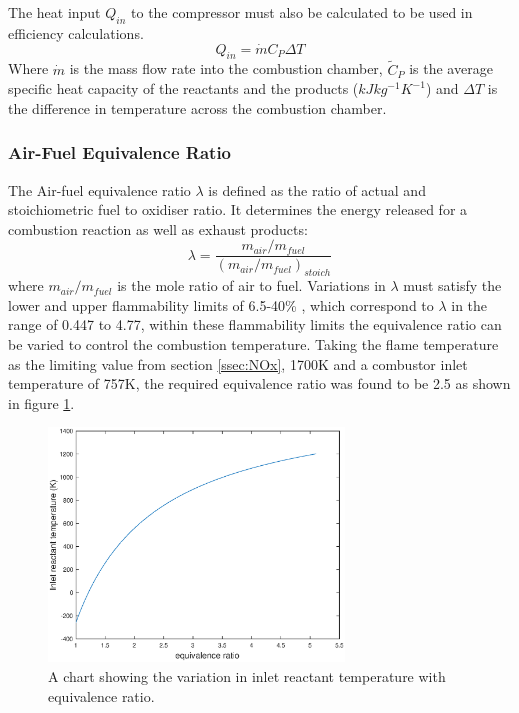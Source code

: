 The heat input $Q_{in}$ to the compressor must also be calculated to be used in efficiency calculations.
\begin{equation} \label{eq:heatequation}
Q_{in} = \dot{m}C_P\Delta T
\end{equation}
Where $\dot{m}$ is the mass flow rate into the combustion chamber, $\tilde{C}_P$ is the average specific heat capacity of the reactants and the products ($kJ kg^{-1} K^{-1}$) and $\Delta T$ is the difference in temperature across the combustion chamber.


\subsubsection{Air-Fuel Equivalence Ratio} 
The Air-fuel equivalence ratio $\lambda$ is defined as the ratio of actual and stoichiometric fuel to oxidiser ratio. It determines the energy released for a combustion reaction as well as exhaust products: \begin{equation}
\lambda = \frac{m_{air}/m_{fuel}}{(m_{air}/m_{fuel})_{stoich}}
\end{equation}
where $m_{air}/m_{fuel}$ is the mole ratio of air to fuel. Variations in $\lambda$ must satisfy the lower and upper flammability limits of 6.5-40\% \cite{LFL}, which correspond to $\lambda$ in the range of 0.447 to 4.77, within these flammability limits the equivalence ratio can be varied to control the combustion temperature.
Taking the flame temperature as the limiting value from section \ref{ssec:NOx}, 1700K and a combustor inlet temperature of 757K, the required equivalence ratio was found to be 2.5 as shown in figure \ref{fig:flametemp}.

\begin{figure} [h]
\centering
\includegraphics[width=0.7\textwidth]{./pictures/combustor.eps}
  \caption{A chart showing the variation in inlet reactant temperature with equivalence ratio.} \label{fig:flametemp}
  \end{figure} 

